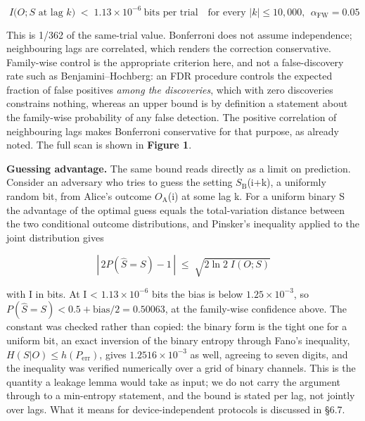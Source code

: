 \documentclass[
  11pt,
]{article}
\begin{document}
\begin{equation}
\boxed{\;I\big(O ; S \text{ at lag } k\big) \;<\; 1.13\times10^{-6}\ \text{bits per trial} \quad\text{for every } |k| \le 10{,}000,\ \ \alpha_{\mathrm{FW}} = 0.05\;}
\label{eq:bound1}
\end{equation}

This is 1/362 of the same-trial value. Bonferroni does not assume
independence; neighbouring lags are correlated, which renders the
correction conservative. Family-wise control is the appropriate
criterion here, and not a false-discovery rate such as
Benjamini--Hochberg: an FDR procedure controls the expected fraction of
false positives \emph{among the discoveries}, which with zero
discoveries constrains nothing, whereas an upper bound is by definition
a statement about the family-wise probability of any false detection.
The positive correlation of neighbouring lags makes Bonferroni
conservative for that purpose, as already noted. The full scan is shown
in \textbf{Figure 1}.

\textbf{Guessing advantage.} The same bound reads directly as a limit on
prediction. Consider an adversary who tries to guess the setting
\(S_{\mathrm{B}}\)(i+k), a uniformly random bit, from Alice's outcome
\(O_{\mathrm{A}}\)(i) at some lag k. For a uniform binary S the
advantage of the optimal guess equals the total-variation distance
between the two conditional outcome distributions, and Pinsker's
inequality applied to the joint distribution gives

\begin{equation}
\left|\,2P(\hat S = S) - 1\,\right| \;\le\; \sqrt{2\ln 2\; I(O ; S)}
\label{eq:pinsker}
\end{equation}

with I in bits. At I \textless{} \(1.13 \times 10^{-6}\) bits the bias
is below \(1.25 \times 10^{-3}\), so
\(P(\hat S = S) < 0.5 + \mathrm{bias}/2 = 0.50063\), at the family-wise
confidence above. The constant was checked rather than copied: the
binary form is the tight one for a uniform bit, an exact inversion of
the binary entropy through Fano's inequality,
\(H(S|O) \le h(P_{\mathrm{err}})\), gives \(1.2516 \times 10^{-3}\) as
well, agreeing to seven digits, and the inequality was verified
numerically over a grid of binary channels. This is the quantity a
leakage lemma would take as input; we do not carry the argument through
to a min-entropy statement, and the bound is stated per lag, not jointly
over lags. What it means for device-independent protocols is discussed
in \S6.7.
\end{document}
